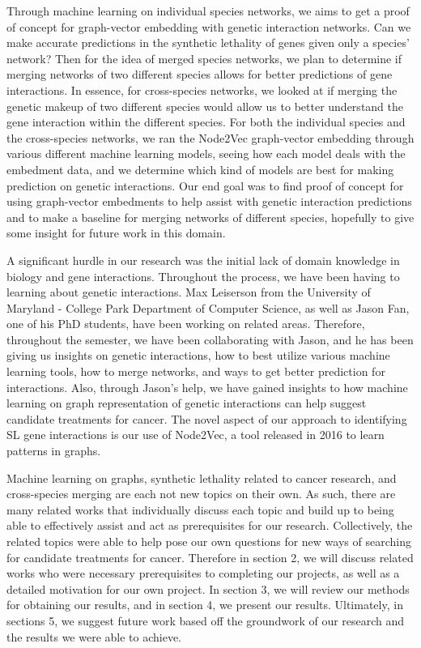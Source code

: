 Through machine learning on individual species networks, we aims to get a proof of concept for graph-vector embedding with genetic interaction networks. Can we make accurate predictions in the synthetic lethality of genes given only a species’ network? Then for the idea of merged species networks, we plan to determine if merging networks of two different species allows for better predictions of gene interactions. In essence, for cross-species networks, we looked at if merging the genetic makeup of two different species would allow us to better understand the gene interaction within the different species. For both the individual species and the cross-species networks, we ran the Node2Vec graph-vector embedding through various different machine learning models, seeing how each model deals with the embedment data, and we  determine which kind of models are best for making prediction on genetic interactions.   Our end goal was to find proof of concept for using graph-vector embedments to help assist with genetic interaction predictions and to make a baseline for merging networks of different species, hopefully to give some insight for future work in this domain.

A significant hurdle in our research was the initial lack of domain knowledge in biology and gene interactions. Throughout the process, we have been having to learning about genetic interactions. Max Leiserson from the University of Maryland - College Park Department of Computer Science, as well as Jason Fan, one of his PhD students, have been working on related areas. Therefore, throughout the semester, we have been collaborating with Jason, and he has been giving us insights on genetic interactions, how to best utilize various machine learning tools, how to merge networks, and ways to get better prediction for interactions. Also, through Jason’s help, we have gained insights to how machine learning on graph representation of genetic interactions can help suggest candidate treatments for cancer. The novel aspect of our approach to identifying SL gene interactions is our use of Node2Vec, a tool released in 2016 to learn patterns in graphs.

Machine learning on graphs, synthetic lethality related to cancer research, and cross-species merging are each not new topics on their own. As such, there are many related works that individually discuss each topic and build up to being able to effectively assist and act as prerequisites for our research. Collectively, the related topics were able to help pose our own questions for new ways of searching for candidate treatments for cancer. Therefore in section 2, we will discuss related works who were necessary prerequisites to completing our projects, as well as a detailed motivation for our own project. In section 3, we will review our methods for obtaining our results, and in section 4, we present our results. Ultimately, in sections 5, we suggest future work based off the groundwork of our research and the results we were able to achieve. 
